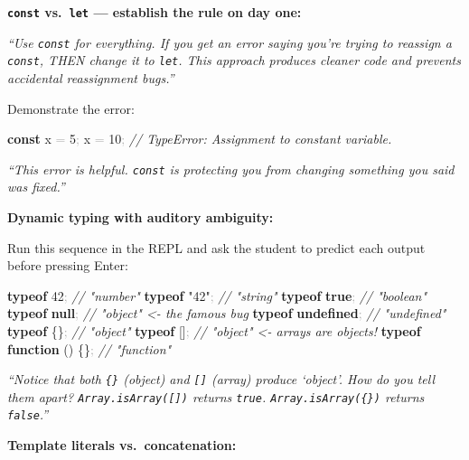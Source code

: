 \documentclass[
  justified,
  openright,
]{tufte-book}
\newcommand{\KeywordTok}[1]{\textcolor{CodeKeyword}{\textbf{#1}}}  %
\newcommand{\StringTok}[1]{\textcolor{CodeString}{#1}}              %
\newcommand{\CommentTok}[1]{\textcolor{CodeComment}{\textit{#1}}}  %
\newcommand{\CodeNumTok}[1]{\textcolor{CodeNumber}{#1}}             %
\newcommand{\OperatorTok}[1]{\textcolor{DarkGray}{#1}}              %
\newenvironment{Shaded}{%
  \begin{mdframed}[style=TufteCode]%
}{%
  \end{mdframed}%
}
\begin{document}
\textbf{\texttt{const} vs.~\texttt{let} --- establish the rule on day
one:}

\emph{``Use \texttt{const} for everything. If you get an error saying
you're trying to reassign a \texttt{const}, THEN change it to
\texttt{let}. This approach produces cleaner code and prevents
accidental reassignment bugs.''}

Demonstrate the error:

\begin{Shaded}
\begin{Highlighting}[]
\KeywordTok{const} x \OperatorTok{=} \CodeNumTok{5}\OperatorTok{;}
x \OperatorTok{=} \CodeNumTok{10}\OperatorTok{;} \CommentTok{// TypeError: Assignment to constant variable.}
\end{Highlighting}
\end{Shaded}

\emph{``This error is helpful. \texttt{const} is protecting you from
changing something you said was fixed.''}

\textbf{Dynamic typing with auditory ambiguity:}

Run this sequence in the REPL and ask the student to predict each output
before pressing Enter:

\begin{Shaded}
\begin{Highlighting}[]
\KeywordTok{typeof} \CodeNumTok{42}\OperatorTok{;} \CommentTok{// "number"}
\KeywordTok{typeof} \StringTok{"42"}\OperatorTok{;} \CommentTok{// "string"}
\KeywordTok{typeof} \KeywordTok{true}\OperatorTok{;} \CommentTok{// "boolean"}
\KeywordTok{typeof} \KeywordTok{null}\OperatorTok{;} \CommentTok{// "object"  \textless{}{-} the famous bug}
\KeywordTok{typeof} \KeywordTok{undefined}\OperatorTok{;} \CommentTok{// "undefined"}
\KeywordTok{typeof} \{\}\OperatorTok{;} \CommentTok{// "object"}
\KeywordTok{typeof} []\OperatorTok{;} \CommentTok{// "object"  \textless{}{-} arrays are objects!}
\KeywordTok{typeof} \KeywordTok{function} () \{\}\OperatorTok{;} \CommentTok{// "function"}
\end{Highlighting}
\end{Shaded}

\emph{``Notice that both \texttt{\{\}} (object) and \texttt{{[}{]}}
(array) produce `object'. How do you tell them apart?
\texttt{Array.isArray({[}{]})} returns \texttt{true}.
\texttt{Array.isArray(\{\})} returns \texttt{false}.''}

\textbf{Template literals vs.~concatenation:}
\end{document}
